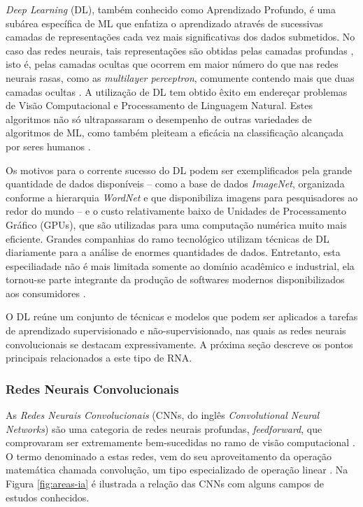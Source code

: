 \emph{Deep Learning} (DL), também conhecido como Aprendizado Profundo, é uma subárea específica de ML que enfatiza o aprendizado através de sucessivas camadas de representações cada vez mais significativas dos dados submetidos. No caso das redes neurais, tais representações são obtidas pelas camadas profundas \cite{chollet}, isto é, pelas camadas ocultas que ocorrem em maior número do que nas redes neurais rasas, como as \emph{multilayer perceptron}, comumente contendo mais que duas camadas ocultas \cite{heaton}. A utilização de DL tem obtido êxito em endereçar problemas de Visão Computacional e Processamento de Linguagem Natural. Estes algoritmos não só ultrapassaram o desempenho de outras variedades de algoritmos de ML, como também pleiteam a eficácia na classificação alcançada por seres humanos \cite{buduma}.

Os motivos para o corrente sucesso do DL podem ser exemplificados pela grande quantidade de dados disponíveis -- como a base de dados \emph{ImageNet}, organizada conforme a hierarquia \emph{WordNet} e que disponibiliza imagens para pesquisadores ao redor do mundo \cite{imagenet} -- e o custo relativamente baixo de Unidades de Processamento Gráfico (GPUs), que são utilizadas para uma computação numérica muito mais eficiente. Grandes companhias do ramo tecnológico utilizam técnicas de DL diariamente para a análise de enormes quantidades de dados. Entretanto, esta especiliadade não é mais limitada somente ao domínio acadêmico e industrial, ela tornou-se parte integrante da produção de softwares modernos disponibilizados aos consumidores \cite{gulli}.

O DL reúne um conjunto de técnicas e modelos que podem ser aplicados a tarefas de aprendizado supervisionado e não-supervisionado, nas quais as redes neurais convolucionais se destacam expressivamente. A próxima seção descreve os pontos principais relacionados a este tipo de RNA.

\subsubsection{Redes Neurais Convolucionais}
\label{subsubsec:cnns}

As \emph{Redes Neurais Convolucionais} (CNNs, do inglês \emph{Convolutional Neural Networks}) são uma categoria de redes neurais profundas, \emph{feedforward}, que comprovaram ser extremamente bem-sucedidas no ramo de visão computacional \cite{khan}. O termo denominado a estas redes, vem do seu aproveitamento da operação matemática chamada convolução, um tipo especializado de operação linear \cite{goodfellow}. Na Figura \ref{fig:areas-ia} é ilustrada a relação das CNNs com alguns campos de estudos conhecidos.

